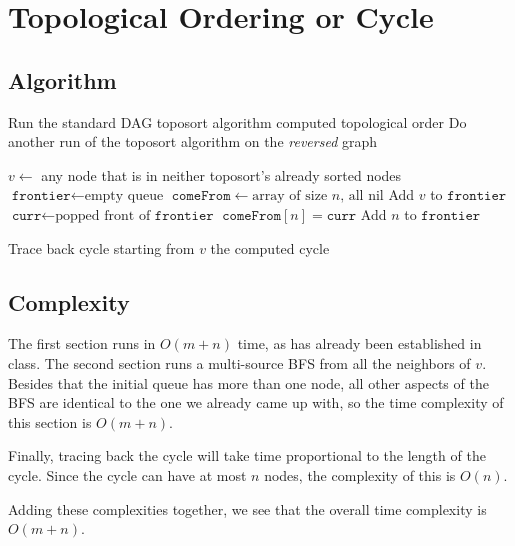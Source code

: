 \documentclass[12pt]{article}
\begin{document}
\section{Topological Ordering or Cycle}

\subsection*{Algorithm}

\begin{algorithmic}[1]
    \State Run the standard DAG toposort algorithm
        \State \Return computed topological order
    \EndIf
    \State Do another run of the toposort algorithm on the \textit{reversed} graph

    \item[]
    \State $v \gets$ any node that is in neither toposort's already sorted nodes
    \State $\texttt{frontier} \gets \text{empty queue}$
    \State $\texttt{comeFrom} \gets \text{array of size }n\text{, all nil}$
    \State Add $v$ to $\texttt{frontier}$
        \State $\texttt{curr} \gets \text{popped front of }\texttt{frontier}$
                \State $\texttt{comeFrom}[n] = \texttt{curr}$
                \State Add $n$ to $\texttt{frontier}$
            \EndIf
        \EndFor
    \EndWhile

    \item[]
    \State Trace back cycle starting from $v$
    \State \Return the computed cycle
\end{algorithmic}

\subsection*{Complexity}

The first section runs in $O(m+n)$ time, as has already been established in class.
The second section runs a multi-source BFS from all the neighbors of $v$.
Besides that the initial queue has more than one node, all other aspects
of the BFS are identical to the one we already came up with,
so the time complexity of this section is $O(m+n)$.

Finally, tracing back the cycle will take time proportional to the length of the cycle.
Since the cycle can have at most $n$ nodes, the complexity of this is $O(n)$.

Adding these complexities together,
we see that the overall time complexity is $O(m+n)$.
\end{document}
